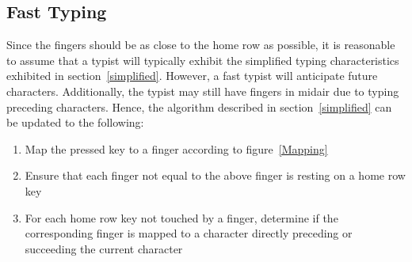 \documentclass[12pt, letterpaper, titlepage]{article}
\begin{document}
\subsection{Fast Typing}
Since the fingers should be as close to the home row as possible,
it is reasonable to assume that a typist will typically exhibit the simplified typing characteristics exhibited in section~\ref{simplified}.
However, a fast typist will anticipate future characters.
Additionally, the typist may still have fingers in midair due to typing preceding characters.
Hence, the algorithm described in section~\ref{simplified} can be updated to the following:
\begin{enumerate}
\item Map the pressed key to a finger according to figure~\ref{Mapping}
\item Ensure that each finger not equal to the above finger is resting on a home row key
\item For each home row key not touched by a finger, determine if the corresponding finger is mapped to a character directly preceding or succeeding the current character
\end{enumerate}


\clearpage
{}
{}

\end{document}
